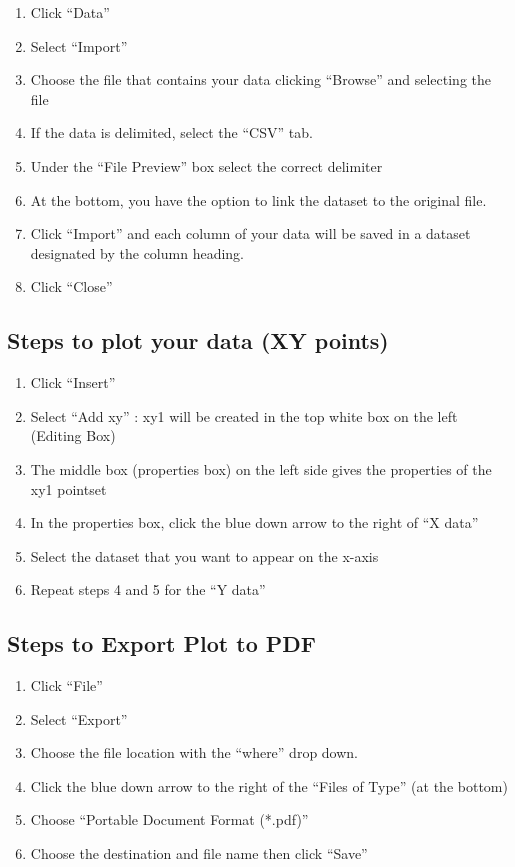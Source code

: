 \begin{enumerate}
\item Click ``Data''
\item Select ``Import''
\item Choose the file that contains your data clicking ``Browse'' and selecting the file
\item If the data is delimited, select the ``CSV'' tab.
\item Under the ``File Preview'' box select the correct delimiter
\item At the bottom, you have the option to link the dataset to the original file.
\item Click ``Import'' and each column of your data will be saved in a dataset designated by the column heading.
\item Click ``Close''
\end{enumerate}

\subsection{Steps to plot your data (XY points)}

\begin{enumerate}
\item Click ``Insert''
\item Select ``Add xy'' : xy1 will be created in the top white box on the left (Editing Box)
\item The middle box (properties box) on the left side gives the properties of the xy1 pointset
\item In the properties box, click the blue down arrow to the right of ``X data''
\item Select the dataset that you want to appear on the x-axis
\item Repeat steps 4 and 5 for the ``Y data''
\end{enumerate}

\subsection{Steps to Export Plot to PDF}

\begin{enumerate}
\item Click ``File''
\item Select ``Export''
\item Choose the file location with the ``where'' drop down.
\item Click the blue down arrow to the right of the ``Files of Type'' (at the bottom)
\item Choose ``Portable Document Format (*.pdf)''
\item Choose the destination and file name then click ``Save''
\end{enumerate}

